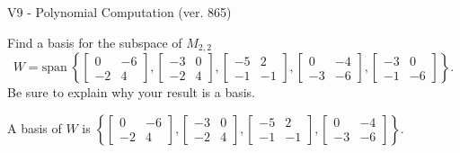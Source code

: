 \begin{exercise}
  \begin{exerciseTitle}V9 - Polynomial Computation (ver. 865)\end{exerciseTitle}
  \begin{exerciseStatement}
    Find a basis for the subspace of \(M_{2,2}\) 
\[W=\mathrm{span}\ \left\{\left[\begin{array}{cc}
0 & -6 \\
-2 & 4
\end{array}\right] , \left[\begin{array}{cc}
-3 & 0 \\
-2 & 4
\end{array}\right] , \left[\begin{array}{cc}
-5 & 2 \\
-1 & -1
\end{array}\right] , \left[\begin{array}{cc}
0 & -4 \\
-3 & -6
\end{array}\right] , \left[\begin{array}{cc}
-3 & 0 \\
-1 & -6
\end{array}\right]\right\}.\]
 Be sure to explain why your result is a basis.


  \end{exerciseStatement}
  \begin{exerciseAnswer}
   A basis of \(W\) is  \(\left\{\left[\begin{array}{cc}
0 & -6 \\
-2 & 4
\end{array}\right] , \left[\begin{array}{cc}
-3 & 0 \\
-2 & 4
\end{array}\right] , \left[\begin{array}{cc}
-5 & 2 \\
-1 & -1
\end{array}\right] , \left[\begin{array}{cc}
0 & -4 \\
-3 & -6
\end{array}\right]\right\}\).
  


  \end{exerciseAnswer}
\end{exercise}